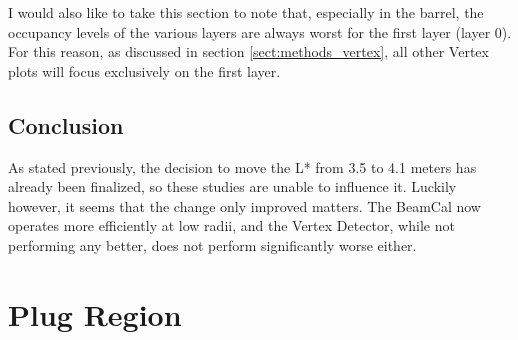 \documentclass{report}
\begin{document}
                I would also like to take this section to note that, especially in the barrel, the occupancy levels of the various layers are always worst for the first layer (layer 0). For this reason, as discussed in section \ref{sect:methods_vertex}, all other Vertex plots will focus exclusively on the first layer.

            \subsection{Conclusion}
                As stated previously, the decision to move the L* from 3.5 to 4.1 meters has already been finalized, so these studies are unable to influence it. Luckily however, it seems that the change only improved matters. The BeamCal now operates more efficiently at low radii, and the Vertex Detector, while not performing any better, does not perform significantly worse either.


        \section{Plug Region}
\end{document}
